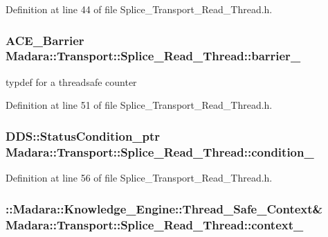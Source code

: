 Definition at line 44 of file Splice\_\-Transport\_\-Read\_\-Thread.h.

\hypertarget{classMadara_1_1Transport_1_1Splice__Read__Thread_a1ac9be82d884c2366923bd5f95d6b3c8}{
\subsubsection[{barrier\_\-}]{\setlength{\rightskip}{0pt plus 5cm}ACE\_\-Barrier {\bf Madara::Transport::Splice\_\-Read\_\-Thread::barrier\_\-}}}
\label{de/db7/classMadara_1_1Transport_1_1Splice__Read__Thread_a1ac9be82d884c2366923bd5f95d6b3c8}


typdef for a threadsafe counter 



Definition at line 51 of file Splice\_\-Transport\_\-Read\_\-Thread.h.

\hypertarget{classMadara_1_1Transport_1_1Splice__Read__Thread_a8dabbe08768a63ad0b8625d4ebbabe06}{
\subsubsection[{condition\_\-}]{\setlength{\rightskip}{0pt plus 5cm}DDS::StatusCondition\_\-ptr {\bf Madara::Transport::Splice\_\-Read\_\-Thread::condition\_\-}}}
\label{de/db7/classMadara_1_1Transport_1_1Splice__Read__Thread_a8dabbe08768a63ad0b8625d4ebbabe06}


Definition at line 56 of file Splice\_\-Transport\_\-Read\_\-Thread.h.

\hypertarget{classMadara_1_1Transport_1_1Splice__Read__Thread_a899ad85e073aacfdb1d9000b39ff5960}{
\subsubsection[{context\_\-}]{\setlength{\rightskip}{0pt plus 5cm}::{\bf Madara::Knowledge\_\-Engine::Thread\_\-Safe\_\-Context}\& {\bf Madara::Transport::Splice\_\-Read\_\-Thread::context\_\-}}}
\label{de/db7/classMadara_1_1Transport_1_1Splice__Read__Thread_a899ad85e073aacfdb1d9000b39ff5960}


